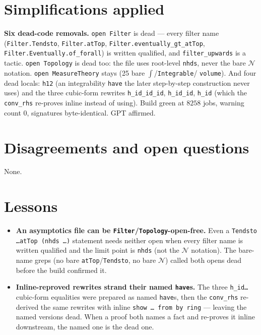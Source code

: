 \documentclass[11pt]{article}
\begin{document}
\section{Simplifications applied}
\textbf{Six dead-code removals.} \texttt{open Filter} is dead --- every filter name
(\texttt{Filter.Tendsto}, \texttt{Filter.atTop}, \texttt{Filter.eventually\_gt\_atTop},
\texttt{Filter.Eventually.of\_forall}) is written qualified, and \texttt{filter\_upwards} is a
tactic. \texttt{open Topology} is dead too: the file uses root-level \texttt{nhds}, never the bare
$\mathcal N$ notation. \texttt{open MeasureTheory} stays (25 bare $\int$/\texttt{Integrable}/%
\texttt{volume}). And four dead locals: \texttt{h12} (an integrability \texttt{have} the later
step-by-step construction never uses) and the three cubic-form rewrites \texttt{h\_id\_id\_id},
\texttt{h\_id\_id}, \texttt{h\_id} (which the \texttt{conv\_rhs} re-proves inline instead of using).
Build green at $8258$ jobs, warning count $0$, signatures byte-identical. GPT affirmed.

\section{Disagreements and open questions}
None.

\section{Lessons}
\begin{itemize}[noitemsep]
  \item \textbf{An asymptotics file can be \texttt{Filter}/\texttt{Topology}-open-free.} Even a
    \texttt{Tendsto \dots atTop (nhds \dots)} statement needs neither open when every filter name is
    written qualified and the limit point is \texttt{nhds} (not the $\mathcal N$ notation). The
    bare-name greps (no bare \texttt{atTop}/\texttt{Tendsto}, no bare $\mathcal N$) called both opens
    dead before the build confirmed it.
  \item \textbf{Inline-reproved rewrites strand their named \texttt{have}s.} The three
    \texttt{h\_id\dots} cubic-form equalities were prepared as named \texttt{have}s, then the
    \texttt{conv\_rhs} re-derived the same rewrites with inline \texttt{show \dots\ from by ring} ---
    leaving the named versions dead. When a proof both names a fact and re-proves it inline
    downstream, the named one is the dead one.
\end{itemize}
\end{document}

